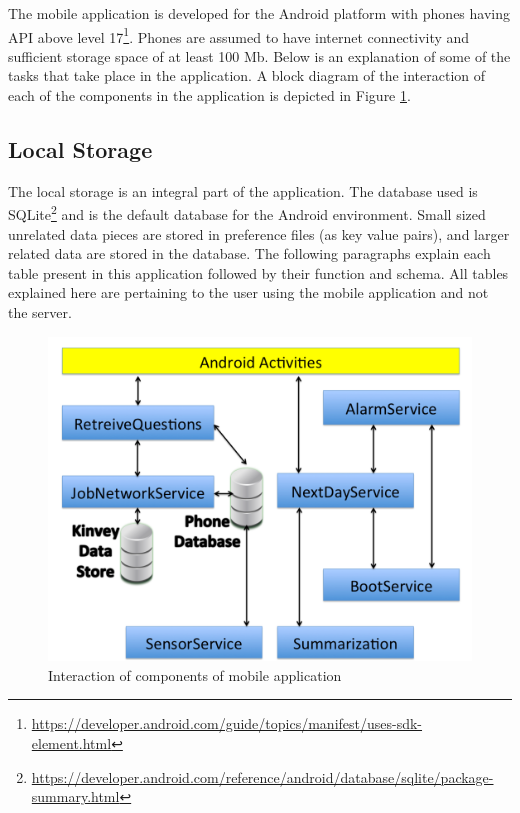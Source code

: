 The mobile application is developed for the Android platform with phones having API above level 17\footnote{\url{https://developer.android.com/guide/topics/manifest/uses-sdk-element.html}}. Phones are assumed to have internet connectivity and sufficient storage space of at least 100 Mb.
Below is an explanation of some of the tasks that take place in the application. A block diagram of the interaction of each of the components in the application is depicted in Figure \ref{fig:chap5_app}.

\subsection{Local Storage} \label{loc}
The local storage is an integral part of the application. The database used is SQLite\footnote{\url{https://developer.android.com/reference/android/database/sqlite/package-summary.html}} and is the default database
for the Android environment. Small sized unrelated data pieces are stored in preference files (as key value pairs), and larger related
data are stored in the database. The following paragraphs explain each table present in this application followed by
their function and schema. All tables explained here are pertaining to the user using the mobile application and not the server.

\begin{figure}[ht!]
\centering
\includegraphics[width=\textwidth,keepaspectratio]{./images/chap1}
\caption{Interaction of components of mobile application}
\label{fig:chap5_app}
\end{figure}

